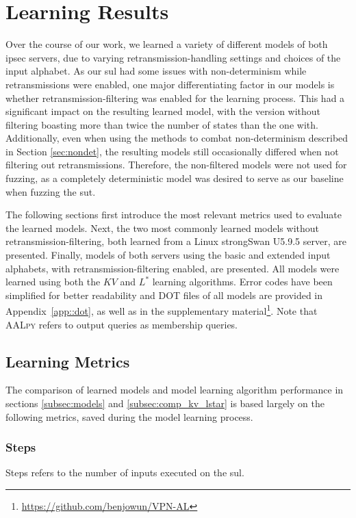 \section{Learning Results} \label{sec:learnresults}
Over the course of our work, we learned a variety of different models of both \ac{ipsec} servers, due to varying retransmission-handling settings and choices of the input alphabet. As our \ac{sul} had some issues with non-determinism while retransmissions were enabled, one major differentiating factor in our models is whether retransmission-filtering was enabled for the learning process. This had a significant impact on the resulting learned model, with the version without filtering boasting more than twice the number of states than the one with. Additionally, even when using the methods to combat non-determinism described in Section \ref{sec:nondet}, the resulting models still occasionally differed when not filtering out retransmissions. Therefore, the non-filtered models were not used for fuzzing, as a completely deterministic model was desired to serve as our baseline when fuzzing the \ac{sut}.

The following sections first introduce the most relevant metrics used to evaluate the learned models. Next, the two most commonly learned models without retransmission-filtering, both learned from a Linux strongSwan U5.9.5 server, are presented. Finally, models of both servers using the basic and extended input alphabets, with retransmission-filtering enabled, are presented. All models were learned using both the $KV$ and $L^*$ learning algorithms. Error codes have been simplified for better readability and DOT files of all models are provided in Appendix~\ref{app::dot}, as well as in the supplementary material\footnote{\url{https://github.com/benjowun/VPN-AL}}. Note that \textsc{AALpy} refers to output queries as membership queries.

\newpage

\subsection{Learning Metrics} \label{subsec:metrics}
The comparison of learned models and model learning algorithm performance in sections \ref{subsec:models} and \ref{subsec:comp_kv_lstar} is based largely on the following metrics, saved during the model learning process.

\subsubsection*{Steps}
Steps refers to the number of inputs executed on the \ac{sul}.

